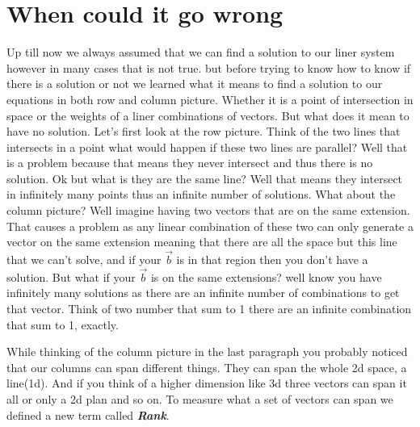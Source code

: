 \documentclass{book}
\begin{document}
	 \section*{When could it go wrong}
	 Up till now we always assumed that we can find a solution to our liner system however in many cases that is not true.
	 but before trying to know how to know if there is a solution or not we learned what it means to find a solution to our equations in both row and column picture. Whether it is a point of intersection in space or the weights of a liner combinations of vectors.
	 \newline But what does it mean to have no solution. Let's first look at the row picture. Think of the two lines that intersects in a point what would happen if these two lines are parallel? Well that is a problem because that means they never intersect and thus there is no solution. Ok but what is they are the same line? Well that means they intersect in infinitely many points thus an infinite number of solutions.
	 \newline What about the column picture? Well imagine having two vectors that are on the same extension. That causes a problem as any linear combination of these two can only generate a vector on the same extension meaning that there are all the space but this line that we can't solve, and if your $\vec{b}$ is in that region then you don't have a solution. But what if your $\vec{b}$ is on the same extensions? well know you have infinitely many solutions as there are an infinite number of combinations to get that vector. Think of two number that sum to 1 there are an infinite combination that sum to 1, exactly.
	 
	 While thinking of the column picture in the last paragraph you probably noticed that our columns can span different things. They can span the whole 2d space, a line(1d). And if you think of a higher dimension like 3d three vectors can span it all or only a 2d plan and so on. To measure what a set of vectors can span we defined a new term called \textbf{\textit{Rank}}.
	 
	 
\end{document}
